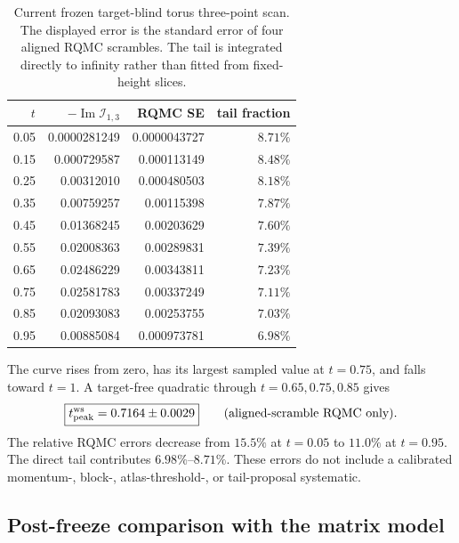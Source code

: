 \documentclass[11pt]{article}
\newcommand{\cI}{\mathcal{I}}
\begin{document}
\begin{table}[htbp]
\centering
\caption{Current frozen target-blind torus three-point scan.  The displayed
error is the standard error of four aligned RQMC scrambles.  The tail is
integrated directly to infinity rather than fitted from fixed-height slices.}
\label{tab:three-point-scan}
\small
\begin{tabular}{r r r r}
\toprule
$t$ & $-\operatorname{Im}\cI_{1,3}$ & RQMC SE & tail fraction\\
\midrule
0.05 & 0.0000281249 & 0.0000043727 & $8.71\%$\\
0.15 & 0.000729587  & 0.000113149  & $8.48\%$\\
0.25 & 0.00312010   & 0.000480503  & $8.18\%$\\
0.35 & 0.00759257   & 0.00115398   & $7.87\%$\\
0.45 & 0.01368245   & 0.00203629   & $7.60\%$\\
0.55 & 0.02008363   & 0.00289831   & $7.39\%$\\
0.65 & 0.02486229   & 0.00343811   & $7.23\%$\\
0.75 & 0.02581783   & 0.00337249   & $7.11\%$\\
0.85 & 0.02093083   & 0.00253755   & $7.03\%$\\
0.95 & 0.00885084   & 0.000973781  & $6.98\%$\\
\bottomrule
\end{tabular}
\end{table}

The curve rises from zero, has its largest sampled value at $t=0.75$, and
falls toward $t=1$.  A target-free quadratic through
$t=0.65,0.75,0.85$ gives
\begin{equation}
 \boxed{t_{\rm peak}^{\rm ws}=0.7164\pm0.0029}
 \qquad\text{(aligned-scramble RQMC only)}.
 \label{eq:three-point-worldsheet-peak}
\end{equation}
The relative RQMC errors decrease from $15.5\%$ at $t=0.05$ to $11.0\%$ at
$t=0.95$.  The direct tail contributes $6.98\%$--$8.71\%$.  These errors do
not include a calibrated momentum-, block-, atlas-threshold-, or
tail-proposal systematic.

\subsection{Post-freeze comparison with the matrix model}
\end{document}
